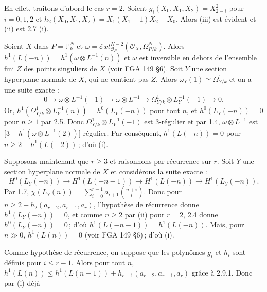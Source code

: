 En
effet, traitons d'abord le cas \(r=2\). Soient \(g_i(X_0,X_1,X_2)=X_{2-i}^2\) pour \(i=0,1,2\) et \(h_2(X_0,X_1,X_2)=X_1(X_1+1)X_2-X_0\). Alors (iii) est évident et (ii) est 2.7 (i).

Soient \(X\) dans \(P=\mathbb P_k^N\) et \(\omega=\mathcal E\!xt^{N-2}_{\mathcal O_P}(\mathcal O_X,\Omega^N_{P/k})\). Alors \(h^1(L(-n))=h^1(\omega\otimes L^{-1}(n))\) et \(\omega\) est inversible en dehors de l'ensemble fini \(Z\) des points singuliers de \(X\) (voir FGA 149 \S 6). Soit \(Y\) une section hyperplane normale de \(X\), qui ne contient pas \(Z\). Alors \(\omega_Y(1)\simeq\Omega^1_{Y/k}\) et on a une suite exacte :
\[
0\longrightarrow \omega\otimes L^{-1}(-1)
\longrightarrow \omega\otimes L^{-1}
\longrightarrow \Omega^1_{Y/k}\otimes L_Y^{-1}(-1)
\longrightarrow0.
\]
Or, \(h^1(\Omega^1_{Y/k}\otimes L_Y^{-1}(n))=h^0(L_Y(-n))\) pour tout \(n\), et \(h^0(L_Y(-n))=0\) pour \(n\ge1\) par 2.5. Donc \(\Omega^1_{Y/k}\otimes L_Y^{-1}(-1)\) est 3-régulier et par 1.4, \(\omega\otimes L^{-1}\) est \(\bigl[3+h^1(\omega\otimes L^{-1}(2))\bigr]\)-régulier. Par conséquent, \(h^1(L(-n))=0\) pour \(n\ge2+h^1(L(-2))\)\,; d'où (i).

Supposons maintenant que \(r\ge3\) et raisonnons par récurrence sur \(r\). Soit \(Y\) une section hyperplane normale de \(X\) et considérons la suite exacte :
\[
H^0(L_Y(-n))\longrightarrow H^1(L(-n-1))
\longrightarrow H^1(L(-n))\longrightarrow H^1(L_Y(-n)).
\tag{2.9.1}
\]
Par 1.7, \(\chi(L_Y(n))=\sum_{i=0}^{r-1}a_{i+1}\binom{n+i}{i}\). Donc pour \(n\ge2+h_2(a_{r-2},a_{r-1},a_r)\), l'hypothèse de récurrence donne \(h^1(L_Y(-n))=0\), et comme \(n\ge2\) par (ii) pour \(r=2\), 2.4 donne \(h^0(L_Y(-n))=0\)\,; d'où \(h^1(L(-n-1))=h^1(L(-n))\). Mais, pour \(n\gg0\), \(h^1(L(n))=0\) (voir FGA 149 \S 6)\,; d'où (i).

Comme hypothèse de récurrence, on suppose que les polynômes \(g_i\) et \(h_i\) sont définis pour \(i\le r-1\). Alors pour tout \(n\), \(h^1(L(n))\le h^1(L(n-1))+h_{r-1}(a_{r-2},a_{r-1},a_r)\) grâce à 2.9.1. Donc par (i) déjà
